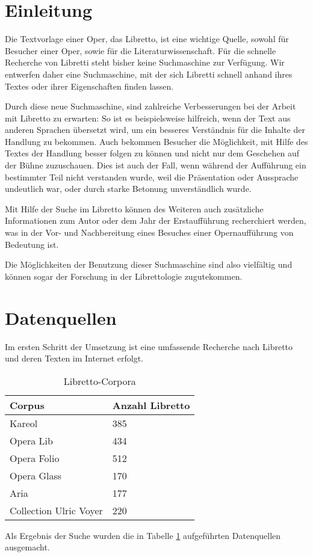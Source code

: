 \section{Einleitung}
Die Textvorlage einer Oper, das Libretto,
ist eine wichtige Quelle, sowohl für Besucher einer Oper,
sowie für die Literaturwissenschaft.
Für die schnelle Recherche von Libretti steht bisher
keine Suchmaschine zur Verfügung.
Wir entwerfen daher eine Suchmaschine, mit der sich Libretti schnell
anhand ihres Textes oder ihrer Eigenschaften finden lassen.

Durch diese neue Suchmaschine, sind zahlreiche Verbesserungen
bei der Arbeit mit Libretto zu erwarten: 
So ist es beispielsweise hilfreich, 
wenn der Text aus anderen Sprachen übersetzt wird, 
um ein besseres Verständnis für die Inhalte der Handlung zu bekommen.
Auch bekommen Besucher die Möglichkeit, 
mit Hilfe des Textes der Handlung besser folgen zu können
und nicht nur dem Geschehen auf der Bühne zuzuschauen.
Dies ist auch der Fall, 
wenn während der Aufführung ein bestimmter Teil nicht verstanden wurde,
weil die Präsentation oder Aussprache undeutlich war,
oder durch starke Betonung unverständlich wurde. 

Mit Hilfe der Suche im Libretto können des Weiteren
auch zusätzliche Informationen zum Autor
oder dem Jahr der Erstaufführung recherchiert werden,
was in der Vor- und Nachbereitung eines Besuches
einer Opernaufführung von Bedeutung ist. 

Die Möglichkeiten der Benutzung dieser Suchmaschine sind also vielfältig
und können sogar der Forschung in der Librettologie zugutekommen.

\section{Datenquellen}
\label{sec:corpora}
Im ersten Schritt der Umsetzung ist eine umfassende Recherche
nach Libretto und deren Texten im Internet erfolgt.
\begin{table}
    \centering
    \begin{tabular}{l l}
        \toprule
        Corpus & Anzahl Libretto \\
        \midrule
        Kareol & 385 \\
        Opera Lib & 434 \\
        Opera Folio & 512 \\
        Opera Glass & 170 \\
        Aria & 177 \\
        Collection Ulric Voyer & 220 \\
        \bottomrule
    \end{tabular}
    \caption{Libretto-Corpora}
    \label{tab:corpora}
\end{table}
Als Ergebnis der Suche wurden die in Tabelle \ref{tab:corpora} aufgeführten
Datenquellen ausgemacht.

